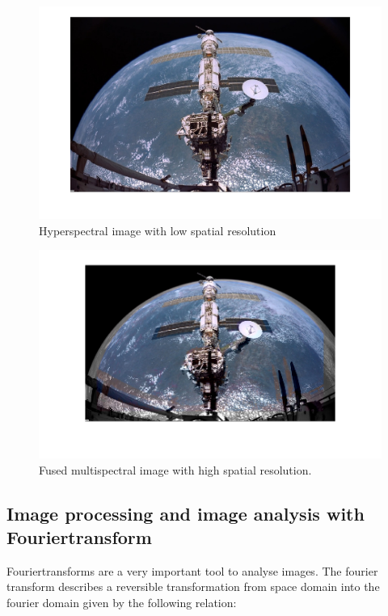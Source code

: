 \begin{figure}[H]
	\centering
		\includegraphics[scale=0.5]{images/Ihyp_lr.png}
		\caption{Hyperspectral image with low spatial resolution}
		\label{fig:hyp_lr}
\end{figure}


\begin{figure}[H]
	\centering
		\includegraphics[scale=0.5]{images/hrlrmixing.png}
		\caption{Fused multispectral image with high spatial resolution.}
		\label{fig:hrlrmixing}
\end{figure}

\subsection{Image processing and image analysis with Fouriertransform}
Fouriertransforms are a very important tool to analyse images. The fourier transform describes a reversible transformation from space domain into the fourier domain given by the following relation:

